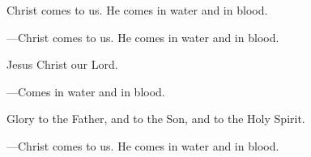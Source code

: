 \responsory

\begin{hangpar}
Christ comes to us. He comes in water and in blood.

{\color{red}---\thinspace }Christ comes to us. He comes in water and in blood.

\medskip Jesus Christ our Lord.

{\color{red}---\thinspace }Comes in water and in blood.

\medskip Glory to the Father, and to the Son, and to the Holy Spirit.

{\color{red}---\thinspace }Christ comes to us. He comes in water and in blood.
\end{hangpar}
